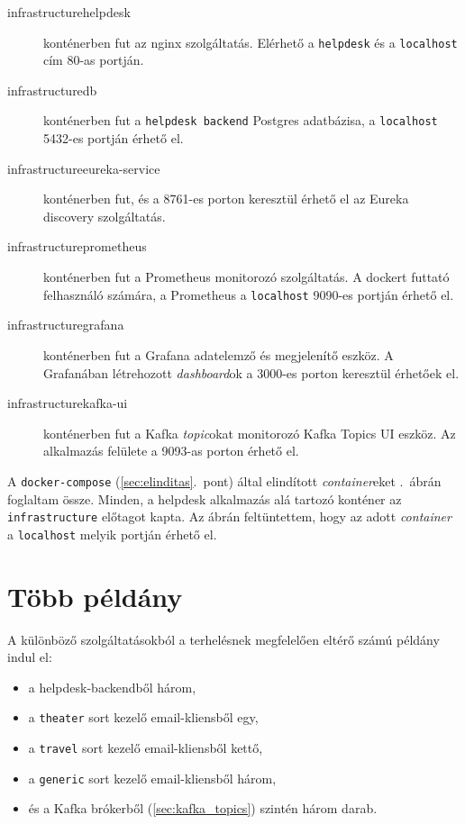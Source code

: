 \begin{description}
	\item[infrastructure\textunderscore helpdesk] konténerben fut az nginx szolgáltatás. Elérhető a \texttt{helpdesk} és a \texttt{localhost} cím 80-as portján.
	
	\item[infrastructure\textunderscore db] konténerben fut a \texttt{helpdesk backend} Postgres adatbázisa, a \texttt{localhost} 5432-es portján érhető el.
	
	\item[infrastructure\textunderscore eureka-service] konténerben fut, és a 8761-es porton keresztül érhető el az Eureka discovery szolgáltatás.
	
	\item[infrastructure\textunderscore prometheus] konténerben fut a Prometheus monitorozó szolgáltatás. A dockert futtató felhasználó számára, a Prometheus a \texttt{localhost} 9090-es portján érhető el.
	
	\item[infrastructure\textunderscore grafana] konténerben fut a Grafana adatelemző és megjelenítő eszköz. A Grafanában létrehozott \emph{dashboard}ok a 3000-es porton keresztül érhetőek el.

	\item[infrastructure\textunderscore kafka-ui] konténerben fut a Kafka \emph{topic}okat monitorozó Kafka Topics UI eszköz. Az alkalmazás felülete a 9093-as porton érhető el.	
\end{description}




A \texttt{docker-compose} (\ref{sec:elinditas}.~pont) által elindított \emph{container}eket .~ábrán foglaltam össze. Minden, a helpdesk alkalmazás alá tartozó konténer az \texttt{infrastructure} előtagot kapta. Az ábrán feltüntettem, hogy az adott \emph{container} a \texttt{localhost} melyik portján érhető el.


\section{Több példány}
A különböző szolgáltatásokból a terhelésnek megfelelően eltérő számú példány indul el:

\begin{itemize}
	\item a helpdesk-backendből három,
	\item a \texttt{theater} sort kezelő email-kliensből egy,
	\item a \texttt{travel} sort kezelő email-kliensből kettő,
	\item a \texttt{generic} sort kezelő email-kliensből három,
	\item és a Kafka brókerből (\ref{sec:kafka_topics}) szintén három darab.
\end{itemize}

